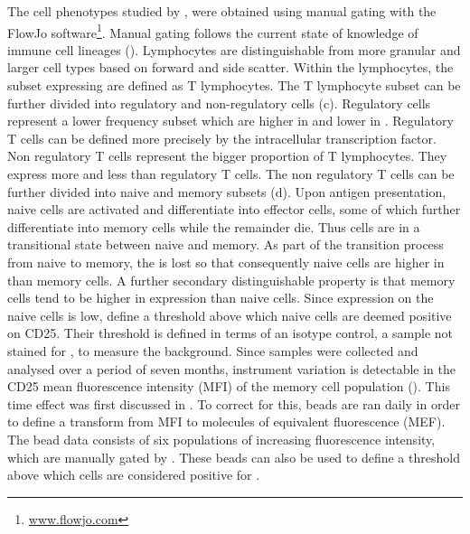 The cell phenotypes studied by \citet{Dendrou:2009dv}, were obtained using manual gating with the FlowJo software\footnote{\url{www.flowjo.com}}.
Manual gating follows the current state of knowledge of immune cell lineages ().
Lymphocytes are distinguishable from more granular and larger cell types based on forward and side scatter.
Within the lymphocytes, the subset expressing  are defined as T lymphocytes.
The \positive T lymphocyte subset can be further divided into regulatory and non-regulatory cells (c).
Regulatory cells represent a lower frequency subset which are higher in  and lower in .
Regulatory T cells can be defined more precisely by the intracellular  transcription factor.
Non regulatory T cells represent the bigger proportion of T lymphocytes.
They express more  and less  than regulatory T cells.
The non regulatory T cells can be further divided into naive and memory subsets (d).  
Upon antigen presentation, naive cells are activated and differentiate into effector cells, some of which further differentiate into memory cells
while the remainder die.
Thus cells are in a transitional state between naive and memory.  
As part of the transition process from naive to memory, the  is lost so that consequently naive cells are higher in  than memory cells.
A further secondary distinguishable property is that memory cells tend to be higher in  expression than naive cells.
Since  expression on the naive cells is low, \citet{Dendrou:2009dv} define a threshold above which naive cells are deemed positive on CD25.
Their threshold is defined in terms of an isotype control, a sample not stained for , to measure the background.
Since samples were collected and analysed over a period of seven months, 
instrument variation is detectable in the CD25 mean fluorescence intensity (MFI) of the memory cell population ().
This time effect was first discussed in \citet{Dendrou:2009bl}.
To correct for this, beads are ran daily in order to define a transform from MFI to molecules of equivalent fluorescence (MEF).
The bead data consists of six populations of increasing fluorescence intensity, which are manually gated by \citet{Dendrou:2009dv}.
These beads can also be used to define a threshold above which cells are considered positive for .


